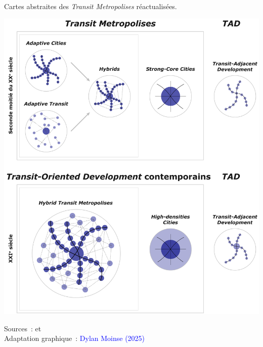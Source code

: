 \begin{refsegment}
    \begin{carte}[h!]\vspace*{4pt}
        \caption{Cartes abstraites des \textsl{Transit Metropolises} réactualisées.}
        \label{fig-chap1:schema-transit-metropolis}
        \centerline{\includegraphics[width=1\columnwidth]{src/Figures/Chap-1/FR_Schema_Alternative_cities_transit.pdf}}
        \vspace{5pt}
        \begin{flushright}\scriptsize{
        Sources~: \textcolor{blue}{\textcite[3]{vos_influence_2014}} et \textcolor{blue}{\textcite[2]{liu_historical_2024}}
        \\
        Adaptation graphique~: \textcolor{blue}{Dylan Moinse (2025)}
        }\end{flushright}
    \end{carte}
    

\end{refsegment}
